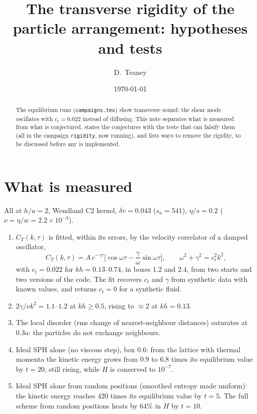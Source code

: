 \documentclass[11pt,aps,preprint,nofootinbib,superscriptaddress,tightenlines]{revtex4-2}
\def\st{\begin{equation}}
\def\stp{\end{equation}}
\begin{document}
\title{The transverse rigidity of the particle arrangement: hypotheses and tests}
\author{D.~Teaney}
\date{\today}

\begin{abstract}
The equilibrium runs (\texttt{campaigns.tex}) show transverse sound: the shear mode
oscillates with $c_t=0.022$ instead of diffusing.  This note separates what is measured
from what is conjectured, states the conjectures with the tests that can falsify them (all
in the campaign \texttt{rigidity}, now running), and lists ways to remove the rigidity, to be
discussed before any is implemented.
\end{abstract}

\maketitle

\section{What is measured}
\label{sec:facts}

All at $h/a=2$, Wendland C2 kernel, $\delta v=0.043$ ($s_a=541$), $\eta/s=0.2$
($\nu=\eta/w=2.2\times10^{-3}$).
\begin{enumerate}
\item $C_T(k,\tau)$ is fitted, within its errors, by the velocity correlator of a damped
  oscillator,
  \st
  C_T(k,\tau)=A\,e^{-\gamma\tau}\Big[\cos\omega\tau-\frac{\gamma}{\omega}\sin\omega\tau\Big],
  \qquad \omega^2+\gamma^2=c_t^2k^2,
  \label{osc}
  \stp
  with $c_t=0.022$ for $kh=0.13$--$0.74$, in boxes $1.2$ and $2.4$, from two starts and two
  versions of the code.  The fit recovers $c_t$ and $\gamma$ from synthetic data with known
  values, and returns $c_t=0$ for a synthetic fluid.
\item $2\gamma/\nu k^2=1.1$--$1.2$ at $kh\ge0.5$, rising to $\approx2$ at $kh=0.13$.
\item The local disorder (rms change of nearest-neighbour distances) saturates at $0.3a$: the
  particles do not exchange neighbours.
\item Ideal SPH alone (no viscous step), box $0.6$: from the lattice with thermal momenta
  the kinetic energy grows from $0.9$ to $6.8$ times its equilibrium value by $t=20$, still
  rising, while $H$ is conserved to $10^{-7}$.
\item Ideal SPH alone from random positions (smoothed entropy made uniform): the kinetic energy
  reaches $420$ times its equilibrium value by $t=5$.  The full scheme from random positions
  heats by $64\%$ in $H$ by $t=10$.
\end{enumerate}
\end{document}
